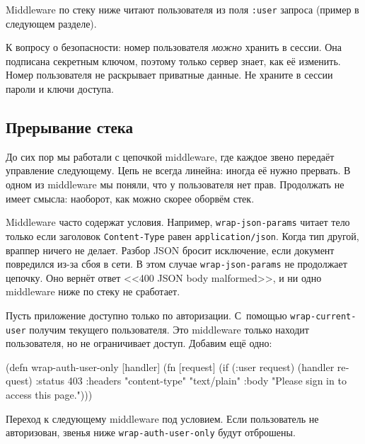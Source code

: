 
Middleware по стеку ниже читают пользователя из поля \verb|:user| запроса
(пример в следующем разделе).

К вопросу о безопасности: номер пользователя \emph{можно} хранить в сессии. Она
подписана секретным ключом, поэтому только сервер знает, как её
изменить. Номер пользователя не раскрывает приватные данные. Не храните в сессии
пароли и ключи доступа.

\subsection{Прерывание стека}


До сих пор мы работали с цепочкой middleware, где каждое звено передаёт
управление следующему. Цепь не всегда линейна: иногда её нужно прервать. В
одном из middleware мы поняли, что у пользователя нет прав. Продолжать не имеет
смысла: наоборот, как можно скорее оборвём стек.


Middleware часто содержат условия. Например, \verb|wrap-json-params| читает
тело только если заголовок \verb|Content-Type| равен
\verb|application/json|. Когда тип другой, враппер ничего не делает. Разбор
JSON бросит исключение, если документ повредился из-за сбоя в сети. В этом
случае \verb|wrap-json-params| не продолжает цепочку. Оно вернёт ответ
<<400 JSON body malformed>>, и ни одно middleware ниже по стеку не сработает.

Пусть приложение доступно только по авторизации. С~помощью
\verb|wrap-current-user| получим текущего пользователя. Это middleware только
находит пользователя, но не ограничивает доступ. Добавим ещё одно:


\begin{english}
  \begin{clojure}
(defn wrap-auth-user-only [handler]
  (fn [request]
    (if (:user request)
      (handler request)
      {:status 403
       :headers {"content-type" "text/plain"}
       :body "Please sign in to access this page."})))
  \end{clojure}
\end{english}

Переход к следующему middleware под условием. Если пользователь не
авторизован, звенья ниже \verb|wrap-auth-user-only| будут отброшены.


